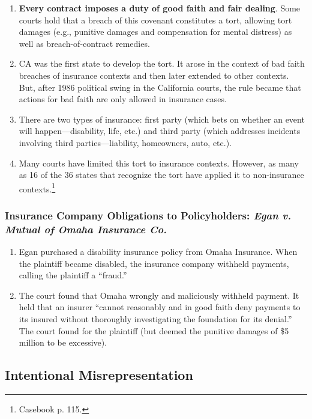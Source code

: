 \begin{enumerate}
    \item \textbf{Every contract imposes a duty of good faith and fair 
    dealing}. Some courts hold that a breach of this covenant constitutes a 
    tort, allowing tort damages (e.g., punitive damages and compensation for 
    mental distress) as well as breach-of-contract remedies.
    \item CA was the first state to develop the tort. It arose in the context 
    of bad faith breaches of insurance contexts and then later extended to 
    other contexts. But, after 1986 political swing in the California courts, 
    the rule became that actions for bad faith are only allowed in insurance 
    cases.
    \item There are two types of insurance: first party (which bets on whether 
    an event will happen---disability, life, etc.) and third party (which 
    addresses incidents involving third parties---liability, homeowners, auto, 
    etc.).
    \item Many courts have limited this tort to insurance contexts. However, 
    as many as 16 of the 36 states that recognize the tort have applied it to 
    non-insurance contexts.\footnote{Casebook p. 115.}
\end{enumerate}

\subsubsection{Insurance Company Obligations to Policyholders: \emph{Egan v.  
Mutual of Omaha Insurance Co.}}

\begin{enumerate}
    \item Egan purchased a disability insurance policy from Omaha Insurance.  
    When the plaintiff became disabled, the insurance company  withheld 
    payments, calling the plaintiff a ``fraud.''
    \item The court found that Omaha wrongly and maliciously withheld payment.  
    It held that an insurer ``cannot reasonably and in good faith deny 
    payments to its insured without thoroughly investigating the foundation 
    for its denial.'' The court found for the plaintiff (but deemed the 
    punitive damages of \$5 million to be excessive).
\end{enumerate}

\subsection{Intentional Misrepresentation}

